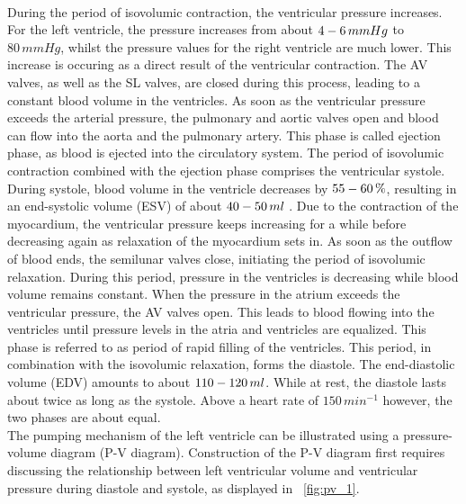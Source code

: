 \\During the period of isovolumic contraction, the ventricular pressure increases. For the left ventricle, the pressure increases from about $4\--6 \, mmHg$ to $80 \, mmHg$, whilst the pressure values for the right ventricle are much lower. This increase is occuring as a direct result of the ventricular contraction. The AV valves, as well as the SL valves, are closed during this process, leading to a constant blood volume in the ventricles. As soon as the ventricular pressure exceeds the arterial pressure, the pulmonary and aortic valves open and blood can flow into the aorta and the pulmonary artery. This phase is called ejection phase, as blood is ejected into the circulatory system. The period of isovolumic contraction combined with the ejection phase comprises the ventricular systole. \cite{HKS4} During systole, blood volume in the ventricle decreases by $55\--60 \, \%$, resulting in an end-systolic volume (ESV) of about $40\--50 \, ml$ \cite{GH20}. Due to the contraction of the myocardium, the ventricular pressure keeps increasing for a while before decreasing again as relaxation of the myocardium sets in. As soon as the outflow of blood ends, the semilunar valves close, initiating the period of isovolumic relaxation. During this period, pressure in the ventricles is decreasing while blood volume remains constant. When the pressure in the atrium exceeds the ventricular pressure, the AV valves open. This leads to blood flowing into the ventricles until pressure levels in the atria and ventricles are equalized. \cite{HKS4} This phase is referred to as period of rapid filling of the ventricles. This period, in combination with the isovolumic relaxation, forms the diastole. The end-diastolic volume (EDV) amounts to about $110\--120 \, ml$. \cite{GH20} While at rest, the diastole lasts about twice as long as the systole. Above a heart rate of $150 \, min^{-1}$ however, the two phases are about equal. \cite{HKS4}
\\The pumping mechanism of the left ventricle can be illustrated using a pressure-volume diagram (P-V diagram). Construction of the P-V diagram first requires discussing the relationship between left ventricular volume and ventricular pressure during diastole and systole, as displayed in \figurename~\ref{fig:pv_1}.
